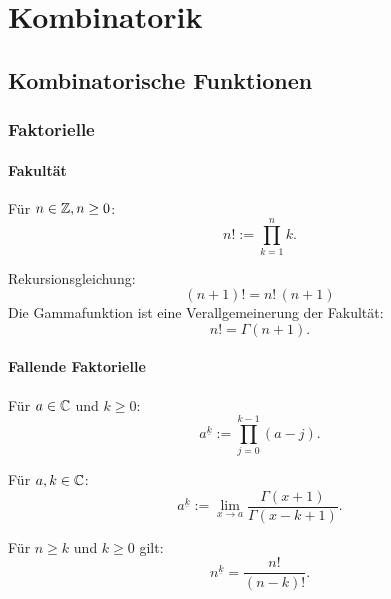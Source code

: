 
\chapter{Kombinatorik}
\section{Kombinatorische Funktionen}
\subsection{Faktorielle}
\subsubsection{Fakultät}
\begin{definition}[Fakultät]
Für $n\in\mathbb Z, n\ge 0$:
\begin{equation}
n! := \prod_{k=1}^n k.
\end{equation}
\end{definition}
\noindent
Rekursionsgleichung:
\begin{equation}
(n+1)! = n!\,(n+1)
\end{equation}
Die Gammafunktion ist eine Verallgemeinerung der Fakultät:
\begin{equation}
n! = \Gamma(n+1).
\end{equation}

\subsubsection{Fallende Faktorielle}
\begin{definition}
Für $a\in\mathbb C$ und $k\ge 0$:
\begin{equation}\label{eq:FF}
a^{\underline k} := \prod_{j=0}^{k-1} (a-j).
\end{equation}

Für $a,k\in\mathbb C$:
\begin{equation}
a^{\underline k} := \lim_{x\to a}\frac{\Gamma(x+1)}{\Gamma(x-k+1)}.
\end{equation}
\end{definition}
\noindent
Für $n\ge k$ und $k\ge 0$ gilt:
\begin{equation}
n^{\underline k} = \frac{n!}{(n-k)!}.
\end{equation}

